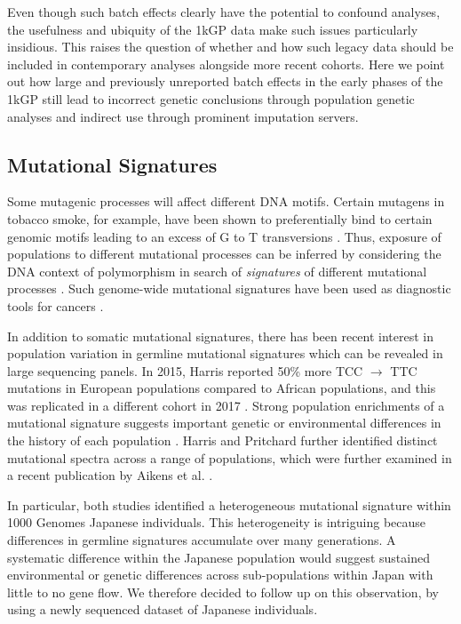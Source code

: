 \documentclass[9pt,lineno]{elife}
\begin{document}
Even though such batch effects clearly have the potential to confound analyses, the usefulness and ubiquity of the 1kGP data make such issues particularly insidious.   
This raises the question of whether and how such legacy data should be included in contemporary analyses alongside more recent cohorts.
Here we point out how large and previously unreported batch effects in the early phases of the 1kGP still lead to incorrect genetic conclusions through population genetic analyses and indirect use through prominent imputation servers.


\subsection{Mutational Signatures}

Some mutagenic processes will affect different DNA motifs. 
Certain mutagens in tobacco smoke, for example, have been shown to preferentially bind to certain genomic motifs leading to an excess of G to T transversions \citep{Pfeifer2002,Pleasance2010}. 
Thus, exposure of populations to different mutational processes can be inferred by considering the DNA context of polymorphism in search of \textit{signatures} of different mutational processes \citep{Alexandrov2013,Shiraishi2015a}. 
Such genome-wide mutational signatures have been used as diagnostic tools for cancers \citep{Alexandrov2013,Shiraishi2015a}.

In addition to somatic mutational signatures, there has been recent interest in population variation in germline mutational signatures which can be revealed in large sequencing panels. 
In 2015, Harris reported 50\% more TCC ${\rightarrow}$ TTC mutations in European populations compared to African populations, and this was replicated in a different cohort in 2017 \citep{Harris2015a, Harris2017a, Mathieson2017a}. 
Strong population enrichments of a mutational signature suggests important genetic or environmental differences in the history of each population \citep{Harris2015a, Harris2017a}. 
Harris and Pritchard further identified distinct mutational spectra across a range of populations, which were further examined in a recent publication by Aikens et al. \citep{Harris2017a,Aikens2018}.
 
 In particular, both studies  identified a heterogeneous mutational signature within 1000 Genomes Japanese individuals.
This heterogeneity is intriguing because differences in germline signatures accumulate over many generations.
A systematic difference within the Japanese population would suggest sustained environmental or genetic differences across sub-populations within Japan with little to no gene flow.
We therefore decided to follow up on this observation, by using a newly sequenced dataset of Japanese individuals. 
\end{document}
